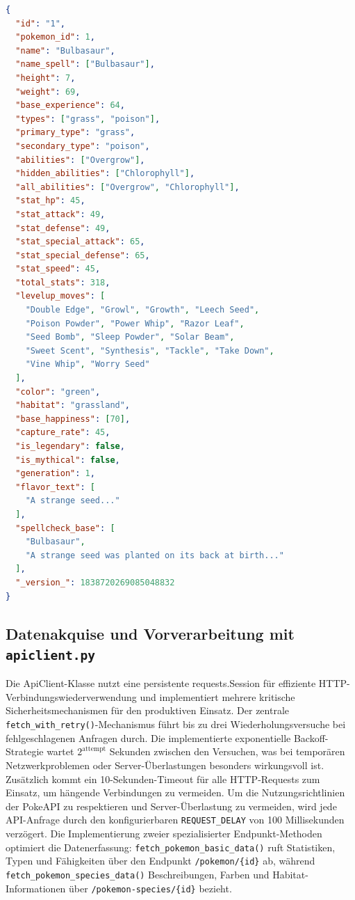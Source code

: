 \noindent
\begin{minipage}{\linewidth}
\begin{lstlisting}[language=json, caption=Beispiel eines indexierten JSON-Dokuments in Solr, label=lst:solr_document, basicstyle=\footnotesize\ttfamily, breaklines=true]
{
  "id": "1",
  "pokemon_id": 1,
  "name": "Bulbasaur",
  "name_spell": ["Bulbasaur"],
  "height": 7,
  "weight": 69,
  "base_experience": 64,
  "types": ["grass", "poison"],
  "primary_type": "grass",
  "secondary_type": "poison",
  "abilities": ["Overgrow"],
  "hidden_abilities": ["Chlorophyll"],
  "all_abilities": ["Overgrow", "Chlorophyll"],
  "stat_hp": 45,
  "stat_attack": 49,
  "stat_defense": 49,
  "stat_special_attack": 65,
  "stat_special_defense": 65,
  "stat_speed": 45,
  "total_stats": 318,
  "levelup_moves": [
    "Double Edge", "Growl", "Growth", "Leech Seed", 
    "Poison Powder", "Power Whip", "Razor Leaf", 
    "Seed Bomb", "Sleep Powder", "Solar Beam", 
    "Sweet Scent", "Synthesis", "Tackle", "Take Down", 
    "Vine Whip", "Worry Seed"
  ],
  "color": "green",
  "habitat": "grassland",
  "base_happiness": [70],
  "capture_rate": 45,
  "is_legendary": false,
  "is_mythical": false,
  "generation": 1,
  "flavor_text": [
    "A strange seed..."
  ],
  "spellcheck_base": [
    "Bulbasaur",
    "A strange seed was planted on its back at birth..."
  ],
  "_version_": 1838720269085048832
}
\end{lstlisting}
\label{fig:language-distribution}

\end{minipage}

\subsection{Datenakquise und Vorverarbeitung mit \texttt{api\textunderscore client.py}}
\label{sec:datenakquise}

Die ApiClient-Klasse nutzt eine persistente requests.Session für effiziente HTTP-Verbindungswiederverwendung und implementiert 
mehrere kritische Sicherheitsmechanismen für den produktiven Einsatz.
Der zentrale \texttt{fetch\_with\_retry()}-Mechanismus führt bis zu drei Wiederholungsversuche bei fehlgeschlagenen Anfragen durch. Die implementierte exponentielle Backoff-Strategie wartet $2^{\text{attempt}}$ Sekunden zwischen den Versuchen, was bei temporären Netzwerkproblemen oder Server-Überlastungen besonders wirkungsvoll ist. Zusätzlich kommt ein 10-Sekunden-Timeout für alle HTTP-Requests zum Einsatz, um hängende Verbindungen zu vermeiden.
Um die Nutzungsrichtlinien der PokeAPI zu respektieren und Server-Überlastung zu vermeiden, wird jede API-Anfrage durch den konfigurierbaren \texttt{REQUEST\_DELAY} von 100 Millisekunden verzögert. Die Implementierung zweier spezialisierter Endpunkt-Methoden optimiert die Datenerfassung: \texttt{fetch\_pokemon\_basic\_data()} ruft Statistiken, Typen und Fähigkeiten über den Endpunkt \texttt{/pokemon/\{id\}} ab, während \texttt{fetch\_pokemon\_species\_data()} Beschreibungen, Farben und Habitat-Informationen über \texttt{/pokemon-species/\{id\}} bezieht.

